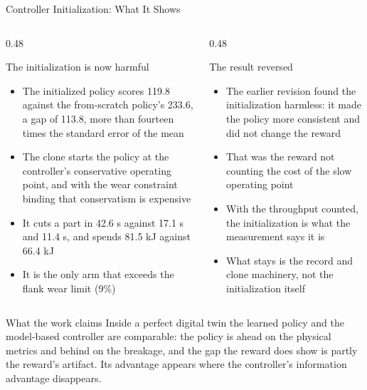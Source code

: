 ﻿\documentclass[11pt,aspectratio=169]{beamer}
\begin{document}
\begin{frame}{Controller Initialization: What It Shows}
    \small
    \begin{columns}[T]
        \begin{column}{0.48\textwidth}
            \begin{alertblock}{The initialization is now harmful}
            \scriptsize
            \begin{itemize}
                \item The initialized policy scores \alert{119.8} against the from-scratch policy's 233.6, a gap of 113.8, more than fourteen times the standard error of the mean
                \item The clone starts the policy at the controller's conservative operating point, and with the wear constraint binding that conservatism is expensive
                \item It cuts a part in \alert{42.6 s} against 17.1 s and 11.4 s, and spends 81.5 kJ against 66.4 kJ
                \item It is the only arm that exceeds the flank wear limit (9\%)
            \end{itemize}
            \end{alertblock}
        \end{column}
        \begin{column}{0.48\textwidth}
            \begin{block}{The result reversed}
            \scriptsize
            \begin{itemize}
                \item The earlier revision found the initialization harmless: it made the policy more consistent and did not change the reward
                \item That was the reward not counting the cost of the slow operating point
                \item With the throughput counted, the initialization is what the measurement says it is
                \item \alert{What stays} is the record and clone machinery, not the initialization itself
            \end{itemize}
            \end{block}
        \end{column}
    \end{columns}

    \vspace{0.2em}
    \begin{alertblock}{What the work claims}
    \scriptsize
    Inside a perfect digital twin the learned policy and the model-based controller are comparable:
    the policy is ahead on the physical metrics and behind on the breakage, and the gap the reward does
    show is partly the reward's artifact. Its advantage appears where the controller's information
    advantage disappears.
    \end{alertblock}
\end{frame}
\end{document}
